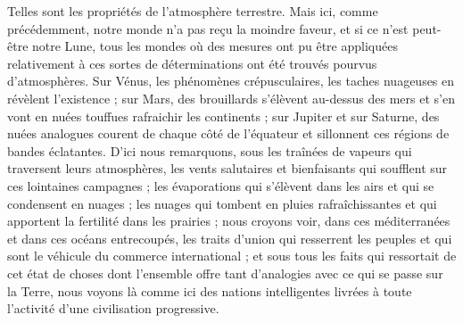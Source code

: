 \documentclass[a4paper, 11pt, oneside]{article}
\begin{document}
Telles sont les propriétés de l'atmosphère terrestre. Mais ici, comme précédemment, notre monde n'a pas reçu la moindre faveur, et si ce n'est peut-être notre Lune, tous les mondes où des mesures ont pu être appliquées relativement à ces sortes de déterminations ont été trouvés pourvus d'atmosphères. Sur Vénus, les phénomènes crépusculaires, les taches nuageuses en révèlent l'existence ; sur Mars, des brouillards s'élèvent au-dessus des mers et s'en vont en nuées touffues rafraichir les continents ; sur Jupiter et sur Saturne, des nuées analogues courent de chaque côté de l'équateur et sillonnent ces régions de bandes éclatantes. D'ici nous remarquons, sous les traînées de vapeurs qui traversent leurs atmosphères, les vents salutaires et bienfaisants qui soufflent sur ces lointaines campagnes ; les évaporations qui s'élèvent dans les airs et qui se condensent en nuages ; les nuages qui tombent en pluies rafraîchissantes et qui apportent la fertilité dans les prairies ; nous croyons voir, dans ces méditerranées et dans ces océans entrecoupés, les traits d'union qui resserrent les peuples et qui sont le véhicule du commerce international ; et sous tous les faits qui ressortait de cet état de choses dont l'ensemble offre tant d'analogies avec ce qui se passe sur la Terre, nous voyons là comme ici des nations intelligentes livrées à toute l'activité d'une civilisation progressive.
\end{document}
